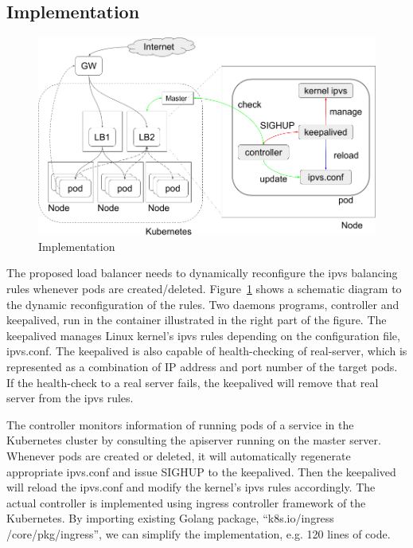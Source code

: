 
\subsection{Implementation}\label{Implementation}

\begin{figure}
\includegraphics[width=\columnwidth]{Figs/ipvs-ingress-schem}
\caption{Implementation}
\label{fig:ipvs-ingress-schem}
\end{figure}

The proposed load balancer needs to dynamically reconfigure the ipvs balancing rules whenever pods are created/deleted. 
Figure~\ref{fig:ipvs-ingress-schem} shows a schematic diagram to the dynamic reconfiguration of the rules.
Two daemons programs, controller and keepalived, run in the container illustrated in the right part of the figure.
The keepalived manages Linux kernel's ipvs rules depending on the configuration file, ipvs.conf.
The keepalived is also capable of health-checking of real-server, 
which is represented as a combination of IP address and port number of the target pods. 
If the health-check to a real server fails, the keepalived will remove that real server from the ipvs rules.

The controller monitors information of running pods of a service in the Kubernetes cluster by consulting the apiserver running on the master server.
Whenever pods are created or deleted, it will automatically regenerate appropriate ipvs.conf and issue SIGHUP to the keepalived.
Then the keepalived will reload the ipvs.conf and modify the kernel's ipvs rules accordingly.  
The actual controller\cite{ktaka_ccmp_2017_826894} is implemented using ingress controller\cite{K8sIngress2017} framework of the Kubernetes. 
By importing existing Golang package, \enquote{k8s.io/ingress /core/pkg/ingress}, we can simplify the implementation, e.g. 
120 lines of code.  


